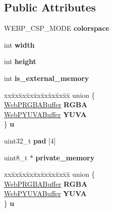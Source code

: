 \subsection*{Public Attributes}
\begin{DoxyCompactItemize}
\item 
\mbox{\label{structWebPDecBuffer_aefebde52238f0298e98c4581caf09bdc}} 
W\+E\+B\+P\+\_\+\+C\+S\+P\+\_\+\+M\+O\+DE {\bfseries colorspace}
\item 
\mbox{\label{structWebPDecBuffer_ad60ebb8cce8580d92351c7aefd594e67}} 
int {\bfseries width}
\item 
\mbox{\label{structWebPDecBuffer_aa939892accab65f2b973554742163821}} 
int {\bfseries height}
\item 
\mbox{\label{structWebPDecBuffer_a635d2008c693ed5a8d09b855e08d89d0}} 
int {\bfseries is\+\_\+external\+\_\+memory}
\item 
\mbox{\label{structWebPDecBuffer_ab8a18c800b9a96d8514da9894730824d}} 
\begin{tabbing}
xx\=xx\=xx\=xx\=xx\=xx\=xx\=xx\=xx\=\kill
union \{\\
\>\hyperlink{structWebPRGBABuffer}{WebPRGBABuffer} {\bfseries RGBA}\\
\>\hyperlink{structWebPYUVABuffer}{WebPYUVABuffer} {\bfseries YUVA}\\
\} {\bfseries u}\\

\end{tabbing}\item 
\mbox{\label{structWebPDecBuffer_ad7134c10286733de687d5a960022e9b2}} 
uint32\+\_\+t {\bfseries pad} \mbox{[}4\mbox{]}
\item 
\mbox{\label{structWebPDecBuffer_a8417c28ac2a0a57fcb7e2b1924af1cc7}} 
uint8\+\_\+t $\ast$ {\bfseries private\+\_\+memory}
\item 
\mbox{\label{structWebPDecBuffer_a7df71bc9e5b2a83a2c19f09eec744698}} 
\begin{tabbing}
xx\=xx\=xx\=xx\=xx\=xx\=xx\=xx\=xx\=\kill
union \{\\
\>\hyperlink{structWebPRGBABuffer}{WebPRGBABuffer} {\bfseries RGBA}\\
\>\hyperlink{structWebPYUVABuffer}{WebPYUVABuffer} {\bfseries YUVA}\\
\} {\bfseries u}\\


\end{tabbing}
\end{DoxyCompactItemize}
